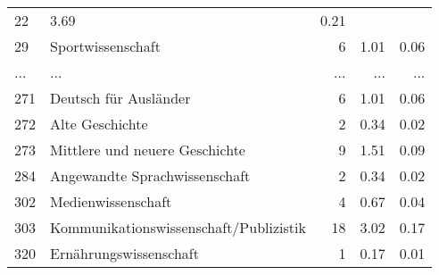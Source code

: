 \begin{longtable}{lXrrr}
          \num{22} &
          \num[round-mode=places,round-precision=2]{3,69} &
          \num[round-mode=places,round-precision=2]{0,21} \\
        29 & \multicolumn{1}{X}{Sportwissenschaft} & %
          \num{6} &
          \num[round-mode=places,round-precision=2]{1,01} &
          \num[round-mode=places,round-precision=2]{0,06} \\
       ... & ... & ... & ... & ... \\
        271 & \multicolumn{1}{X}{Deutsch für Ausländer} & %
          \num{6} &
          \num[round-mode=places,round-precision=2]{1,01} &
          \num[round-mode=places,round-precision=2]{0,06} \\

        272 & \multicolumn{1}{X}{Alte Geschichte} & %
          \num{2} &
          \num[round-mode=places,round-precision=2]{0,34} &
          \num[round-mode=places,round-precision=2]{0,02} \\

        273 & \multicolumn{1}{X}{Mittlere und neuere Geschichte} & %
          \num{9} &
          \num[round-mode=places,round-precision=2]{1,51} &
          \num[round-mode=places,round-precision=2]{0,09} \\

        284 & \multicolumn{1}{X}{Angewandte Sprachwissenschaft} & %
          \num{2} &
          \num[round-mode=places,round-precision=2]{0,34} &
          \num[round-mode=places,round-precision=2]{0,02} \\

        302 & \multicolumn{1}{X}{Medienwissenschaft} & %
          \num{4} &
          \num[round-mode=places,round-precision=2]{0,67} &
          \num[round-mode=places,round-precision=2]{0,04} \\

        303 & \multicolumn{1}{X}{Kommunikationswissenschaft/Publizistik} & %
          \num{18} &
          \num[round-mode=places,round-precision=2]{3,02} &
          \num[round-mode=places,round-precision=2]{0,17} \\

        320 & \multicolumn{1}{X}{Ernährungswissenschaft} & %
          \num{1} &
          \num[round-mode=places,round-precision=2]{0,17} &
          \num[round-mode=places,round-precision=2]{0,01} \\


\end{longtable}
